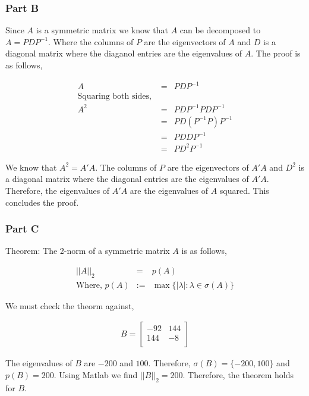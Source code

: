 \subsubsection{Part B}

Since \(A\) is a symmetric matrix we know that \(A\) can be decomposed to \(A = PDP^{-1}\). Where the columns of \(P\) are the eigenvectors of \(A\) and \(D\) is a diagonal matrix where the diaganol entries are the eigenvalues of \(A\).
The proof is as follows,

\begin{eqnarray}
  A &=& PDP^{-1} \\
  \text{Squaring both sides, } \\
  A^{2} &=& PDP^{-1}PDP^{-1} \\
  &=& PD(P^{-1}P)P^{-1} \\
  &=& PDDP^{-1} \\
  &=& PD^{2}P^{-1}
\end{eqnarray}

We know that \(A^{2} = A'A\).
The columns of \(P\) are the eigenvectors of \(A'A\) and \(D^{2}\) is a diagonal matrix where the diagonal entries are the eigenvalues of \(A'A\).
Therefore, the eigenvalues of \(A'A\) are the eigenvalues of \(A\) squared.
This concludes the proof.

\subsubsection{Part C}

Theorem: The 2-norm of a symmetric matrix \(A\) is as follows,

\begin{eqnarray}
  ||A||_2 &=& p(A) \\
  \text{Where, }
  p(A) &:=& \max \{|\lambda| : \lambda \in \sigma(A)\}
\end{eqnarray}

We must check the theorm against,

\begin{eqnarray}
  B =
  \begin{bmatrix}
    -92 & 144 \\
    144 & -8 \\
  \end{bmatrix}
\end{eqnarray}

The eigenvalues of \(B\) are \(-200\) and \(100\). Therefore, \(\sigma(B) = \{-200,100\}\) and \(p(B) = 200\).
Using Matlab we find \(||B||_2 = 200\).
Therefore, the theorem holds for \(B\).

